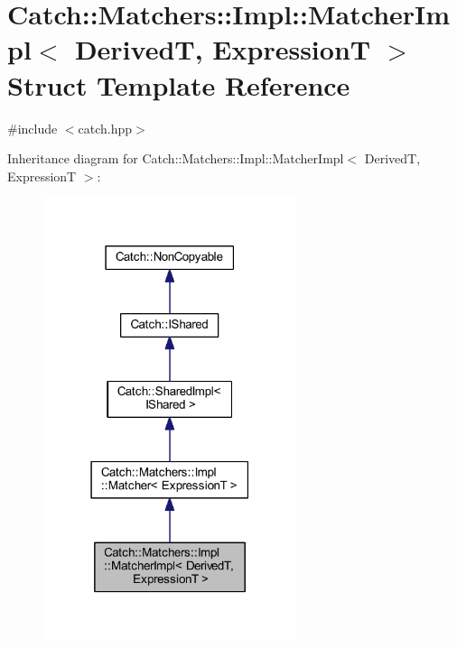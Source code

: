 \hypertarget{struct_catch_1_1_matchers_1_1_impl_1_1_matcher_impl}{}\section{Catch\+:\+:Matchers\+:\+:Impl\+:\+:Matcher\+Impl$<$ DerivedT, ExpressionT $>$ Struct Template Reference}
\label{struct_catch_1_1_matchers_1_1_impl_1_1_matcher_impl}


{\ttfamily \#include $<$catch.\+hpp$>$}



Inheritance diagram for Catch\+:\+:Matchers\+:\+:Impl\+:\+:Matcher\+Impl$<$ DerivedT, ExpressionT $>$\+:\nopagebreak
\begin{figure}[H]
\begin{center}
\leavevmode
\includegraphics[width=210pt]{struct_catch_1_1_matchers_1_1_impl_1_1_matcher_impl__inherit__graph}
\end{center}
\end{figure}


